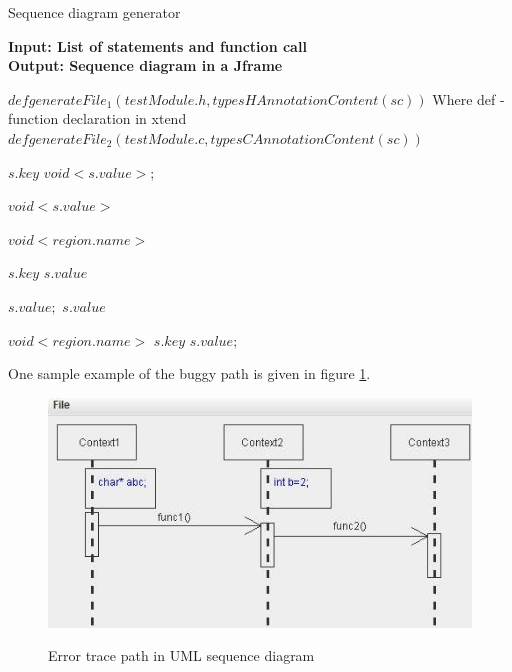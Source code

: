 \begin{algorithm}
	\caption{Sequence diagram generator}	
	{\textbf{Input: List of statements and function call}} \\
	{\textbf{Output: Sequence diagram in a Jframe}}
	\begin{algorithmic}[1]
		
		
		\State $def {generateFile_1} (testModule.h, typesHAnnotationContent(sc)) $ {Where def - function declaration in xtend}
		\State $def {generateFile_2} (testModule.c, typesCAnnotationContent(sc)) $
		\EndFunction
		
		\State $s.key$
		\State $ void <s.value>;$
		\EndIf		
		\EndFor			
		\EndFunction
		
		
		\State $void <s.value> {}$
		\EndIf		
		\EndFor
		
		\State $void <region.name>$
		
		
		\State $s.key$
		\State $s.value$
		\EndIf
		
		\State $s.value;$
		\State $s.value$
		\EndIf
		
		\EndFor 
		\EndIf
		
		\State $void <region.name>$
		\State $s.key$						
		\EndIf
		\State $s.value;$
		\EndFor 
		\EndIf
		
		\EndFor
		
		\EndFunction
		
		
	\end{algorithmic}
\end{algorithm}

 One sample example of the buggy path is given in figure \ref{Error_trace_path}.
\begin{figure}[htbp]
	\centering
	\includegraphics{styles/Error_trace_path.jpg}
	\label{Error_trace_path}
	\caption{Error trace path in UML sequence diagram}
\end{figure}
